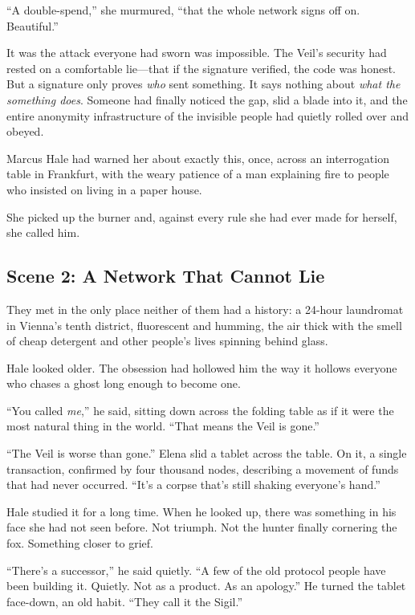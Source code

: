 \documentclass[12pt,letterpaper]{book}
\begin{document}
``A double-spend,'' she murmured, ``that the whole network signs off on. Beautiful.''

It was the attack everyone had sworn was impossible. The Veil's security had rested on a comfortable lie---that if the signature verified, the code was honest. But a signature only proves \emph{who} sent something. It says nothing about \emph{what the something does}. Someone had finally noticed the gap, slid a blade into it, and the entire anonymity infrastructure of the invisible people had quietly rolled over and obeyed.

Marcus Hale had warned her about exactly this, once, across an interrogation table in Frankfurt, with the weary patience of a man explaining fire to people who insisted on living in a paper house.

She picked up the burner and, against every rule she had ever made for herself, she called him.

\hypertarget{scene-2-a-network-that-cannot-lie}{%
\subsection{Scene 2: A Network That Cannot Lie}\label{scene-2-a-network-that-cannot-lie}}

They met in the only place neither of them had a history: a 24-hour laundromat in Vienna's tenth district, fluorescent and humming, the air thick with the smell of cheap detergent and other people's lives spinning behind glass.

Hale looked older. The obsession had hollowed him the way it hollows everyone who chases a ghost long enough to become one.

``You called \emph{me},'' he said, sitting down across the folding table as if it were the most natural thing in the world. ``That means the Veil is gone.''

``The Veil is worse than gone.'' Elena slid a tablet across the table. On it, a single transaction, confirmed by four thousand nodes, describing a movement of funds that had never occurred. ``It's a corpse that's still shaking everyone's hand.''

Hale studied it for a long time. When he looked up, there was something in his face she had not seen before. Not triumph. Not the hunter finally cornering the fox. Something closer to grief.

``There's a successor,'' he said quietly. ``A few of the old protocol people have been building it. Quietly. Not as a product. As an apology.'' He turned the tablet face-down, an old habit. ``They call it the Sigil.''
\end{document}
